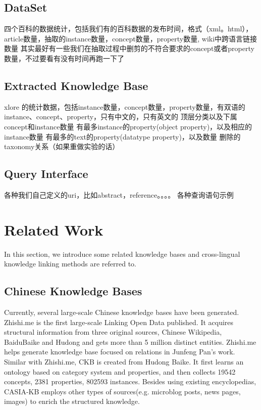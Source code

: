 \documentclass[runningheads,a4paper]{llncs}
\begin{document}
\subsection{DataSet}
四个百科的数据统计，包括我们有的百科数据的发布时间，格式（xml。html），article数量，抽取的instance数量，concept数量，property数量, wiki中跨语言链接数量
其实最好有一些我们在抽取过程中删剪的不符合要求的concept或者property数量，不过要看有没有时间再跑一下了
\subsection{Extracted Knowledge Base}
xlore 的统计数据，包括instance数量，concept数量，property数量，有双语的instance、concept、property，只有中文的，只有英文的
顶层分类以及下属concept和instance数量
有最多instance的property(object property)，以及相应的instance数量
有最多的text的property(datatype property)，以及数量
删除的taxonomy关系（如果重做实验的话）

\subsection{Query Interface}
各种我们自己定义的uri，比如abstract，reference。。。。
各种查询语句示例

\section{Related Work}
\label{sec:work}
In this section, we introduce some related knowledge bases and cross-lingual knowledge linking methods are referred to.
\subsection{Chinese Knowledge Bases}
Currently, several large-scale Chinese knowledge bases have been generated. Zhishi.me\cite{niu2011zhishi,wang2014publishing} is the first large-scale Linking Open Data published. It acquires structural information from three original sources, Chinese Wikipedia, BaiduBaike and Hudong and gets more than 5 million distinct entities. Zhishi.me helps generate knowledge base focused on relations in Junfeng Pan’s work\cite{pan2012building}. 
Similar with Zhishi.me, CKB\cite{wang2012building} is created from Hudong Baike. It first learns an ontology based on category system and properties, and then collects 19542 concepts, 2381 properties, 802593 instances. Besides using existing encyclopedias, CASIA-KB employs other types of sources(e.g. microblog posts, news pages, images) to enrich the structured knowledge.
\end{document}
